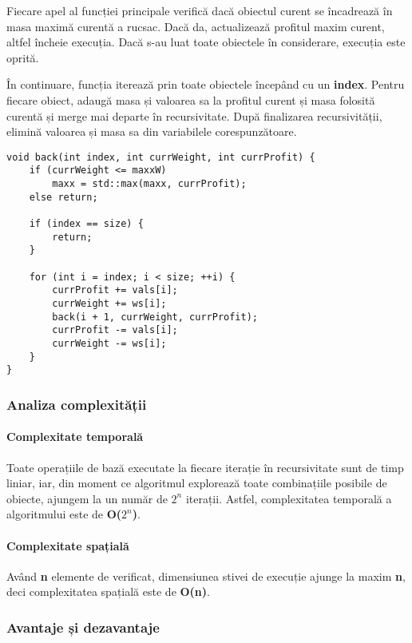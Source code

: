 \documentclass[runningheads]{llncs}
\begin{document}
{Fiecare apel al funcției principale verifică dacă obiectul curent se încadrează în
masa maximă curentă a rucsac. Dacă da, actualizează profitul maxim curent, altfel încheie
execuția. Dacă s-au luat toate obiectele în considerare, execuția este oprită.

În continuare, funcția iterează prin toate obiectele începând cu un \textbf{index}. Pentru
fiecare obiect, adaugă masa și valoarea sa la profitul curent și masa folosită curentă și
merge mai departe în recursivitate. După finalizarea recursivității, elimină valoarea și
masa sa din variabilele corespunzătoare.

\begin{lstlisting}
void back(int index, int currWeight, int currProfit) {
	if (currWeight <= maxxW)
		maxx = std::max(maxx, currProfit);
	else return;

	if (index == size) {
		return;
	}

	for (int i = index; i < size; ++i) {
		currProfit += vals[i];
		currWeight += ws[i];
		back(i + 1, currWeight, currProfit);
		currProfit -= vals[i];
		currWeight -= ws[i];
	}
}
\end{lstlisting}

\subsubsection{Analiza complexității}

\paragraph{Complexitate temporală} Toate operațiile de bază executate la fiecare
iterație în recursivitate sunt de timp liniar, iar, din moment ce algoritmul explorează
toate combinațiile posibile de obiecte, ajungem la un număr de $2^n$ iterații. Astfel,
complexitatea temporală a algoritmului este de \textbf{O($2^n$)}.

\paragraph{Complexitate spațială} Având \textbf{n} elemente de verificat, dimensiunea stivei
de execuție ajunge la maxim \textbf{n}, deci complexitatea spațială este de \textbf{O(n)}.

\subsubsection{Avantaje și dezavantaje}

}
\end{document}

